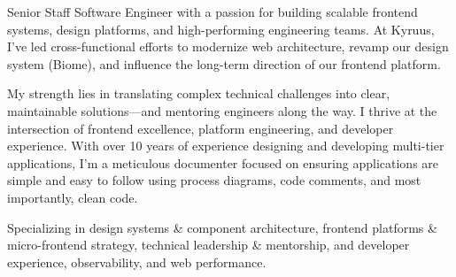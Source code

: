 

\begin{cvparagraph}

Senior Staff Software Engineer with a passion for building scalable frontend systems, design platforms, and high-performing engineering teams. At Kyruus, I've led cross-functional efforts to modernize web architecture, revamp our design system (Biome), and influence the long-term direction of our frontend platform.

My strength lies in translating complex technical challenges into clear, maintainable solutions—and mentoring engineers along the way. I thrive at the intersection of frontend excellence, platform engineering, and developer experience. With over 10 years of experience designing and developing multi-tier applications, I'm a meticulous documenter focused on ensuring applications are simple and easy to follow using process diagrams, code comments, and most importantly, clean code.

Specializing in design systems \& component architecture, frontend platforms \& micro-frontend strategy, technical leadership \& mentorship, and developer experience, observability, and web performance.
\end{cvparagraph}
